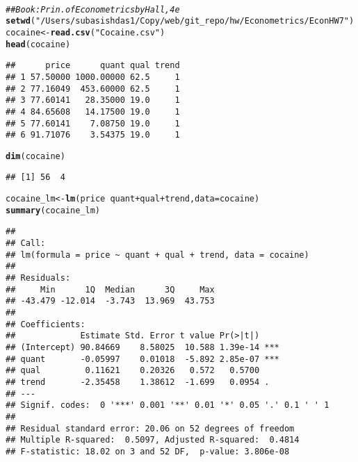 \documentclass[a4paper]{article}\usepackage[]{graphicx}\usepackage[]{color}
\makeatletter
\newcommand{\hlstr}[1]{\textcolor[rgb]{0.192,0.494,0.8}{#1}}%
\newcommand{\hlcom}[1]{\textcolor[rgb]{0.678,0.584,0.686}{\textit{#1}}}%
\newcommand{\hlopt}[1]{\textcolor[rgb]{0,0,0}{#1}}%
\newcommand{\hlstd}[1]{\textcolor[rgb]{0.345,0.345,0.345}{#1}}%
\newcommand{\hlkwb}[1]{\textcolor[rgb]{0.69,0.353,0.396}{#1}}%
\newcommand{\hlkwc}[1]{\textcolor[rgb]{0.333,0.667,0.333}{#1}}%
\newcommand{\hlkwd}[1]{\textcolor[rgb]{0.737,0.353,0.396}{\textbf{#1}}}%
\newenvironment{kframe}{%
 \def\at@end@of@kframe{}%
 \ifinner\ifhmode%
  \def\at@end@of@kframe{\end{minipage}}%
  \begin{minipage}{\columnwidth}%
 \fi\fi%
 \def\FrameCommand##1{\hskip\@totalleftmargin \hskip-\fboxsep
 \colorbox{shadecolor}{##1}\hskip-\fboxsep
     \hskip-\linewidth \hskip-\@totalleftmargin \hskip\columnwidth}%
 \MakeFramed {\advance\hsize-\width
   \@totalleftmargin\z@ \linewidth\hsize
   \@setminipage}}%
 {\par\unskip\endMakeFramed%
 \at@end@of@kframe}
\newenvironment{knitrout}{}{} %
\makeatother
\begin{document}
\\
\begin{knitrout}
\color{fgcolor}\begin{kframe}
\begin{alltt}
\hlcom{## Book: Prin. of Econometrics by Hall, 4 e}
\hlkwd{setwd}\hlstd{(}\hlstr{"/Users/subasishdas1/Copy/web/git_repo/hw/Econometrics/Econ HW 7"}\hlstd{)}
\hlstd{cocaine} \hlkwb{<-} \hlkwd{read.csv}\hlstd{(}\hlstr{"Cocaine.csv"}\hlstd{)}
\hlkwd{head}\hlstd{(cocaine)}
\end{alltt}
\begin{verbatim}
##      price      quant qual trend
## 1 57.50000 1000.00000 62.5     1
## 2 77.16049  453.60000 62.5     1
## 3 77.60141   28.35000 19.0     1
## 4 84.65608   14.17500 19.0     1
## 5 77.60141    7.08750 19.0     1
## 6 91.71076    3.54375 19.0     1
\end{verbatim}
\begin{alltt}
\hlkwd{dim}\hlstd{(cocaine)}
\end{alltt}
\begin{verbatim}
## [1] 56  4
\end{verbatim}
\begin{alltt}
\hlstd{cocaine_lm} \hlkwb{<-} \hlkwd{lm}\hlstd{(price}\hlopt{~} \hlstd{quant}\hlopt{+}\hlstd{qual}\hlopt{+}\hlstd{trend,} \hlkwc{data}\hlstd{= cocaine)}
\hlkwd{summary}\hlstd{(cocaine_lm)}
\end{alltt}
\begin{verbatim}
## 
## Call:
## lm(formula = price ~ quant + qual + trend, data = cocaine)
## 
## Residuals:
##     Min      1Q  Median      3Q     Max 
## -43.479 -12.014  -3.743  13.969  43.753 
## 
## Coefficients:
##             Estimate Std. Error t value Pr(>|t|)    
## (Intercept) 90.84669    8.58025  10.588 1.39e-14 ***
## quant       -0.05997    0.01018  -5.892 2.85e-07 ***
## qual         0.11621    0.20326   0.572   0.5700    
## trend       -2.35458    1.38612  -1.699   0.0954 .  
## ---
## Signif. codes:  0 '***' 0.001 '**' 0.01 '*' 0.05 '.' 0.1 ' ' 1
## 
## Residual standard error: 20.06 on 52 degrees of freedom
## Multiple R-squared:  0.5097,	Adjusted R-squared:  0.4814 
## F-statistic: 18.02 on 3 and 52 DF,  p-value: 3.806e-08
\end{verbatim}
\end{kframe}
\end{knitrout}
\end{document}
